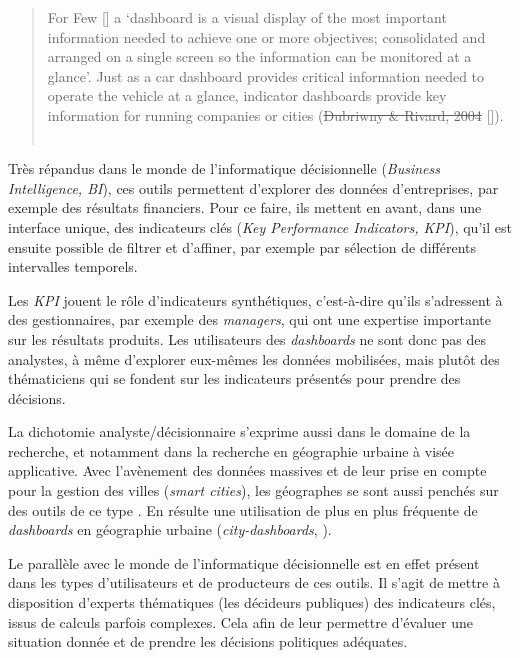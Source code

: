 \begin{quotation}
	\og For Few [\autocite[p.34]{few_information_2006}] a ‘dashboard is
	a visual display of the most important information needed to achieve one or more objectives; consolidated and arranged on a single screen so the information can be monitored at a glance’.
	Just as a car dashboard provides critical information needed to operate the vehicle at a glance, indicator dashboards provide key information for running companies or cities (\st{Dubriwny \& Rivard, 2004} [\cite{rivard_are_2004}]).\fg{}\\
	\mbox{}~ \hfill \cite[p. 11]{kitchin_knowing_2015}
\end{quotation}

Très répandus dans le monde de l'informatique décisionnelle (\textit{Business Intelligence, BI}), ces outils permettent d'explorer des données d'entreprises, par exemple des résultats financiers.
Pour ce faire, ils mettent en avant, dans une interface unique, des indicateurs clés (\textit{Key Performance Indicators, KPI}), qu'il est ensuite possible de filtrer et d'affiner, par exemple par sélection de différents intervalles temporels.

Les \textit{KPI} jouent le rôle d'indicateurs synthétiques, c'est-à-dire qu'ils s'adressent à des gestionnaires, par exemple des \textit{managers}, qui ont une expertise importante sur les résultats produits.
Les utilisateurs des \textit{dashboards} ne sont donc pas des analystes, à même d'explorer eux-mêmes les données mobilisées, mais plutôt des thématiciens qui se fondent sur les indicateurs présentés pour prendre des décisions.

La dichotomie \og analyste/décisionnaire\fg{} s'exprime aussi dans le domaine de la recherche, et notamment dans la recherche en géographie urbaine à visée applicative.
Avec l'avènement des données massives et de leur prise en compte pour la gestion des villes (\textit{smart cities}), les géographes se sont aussi penchés sur des outils de ce type \autocite{laurini_gis_2018}.
En résulte une utilisation de plus en plus fréquente de \textit{dashboards} en géographie urbaine (\og \textit{city-dashboards}\fg{}, \cite{roumpani_creating_2013, kitchin_knowing_2015, batty_perspective_2015}).

Le parallèle avec le monde de l'informatique décisionnelle est en effet présent dans les types d'utilisateurs et de producteurs de ces outils.
Il s'agit de mettre à disposition d'experts thématiques (les décideurs publiques) des indicateurs clés, issus de calculs parfois complexes.
Cela afin de leur permettre d'évaluer une situation donnée et de prendre les décisions politiques adéquates.


